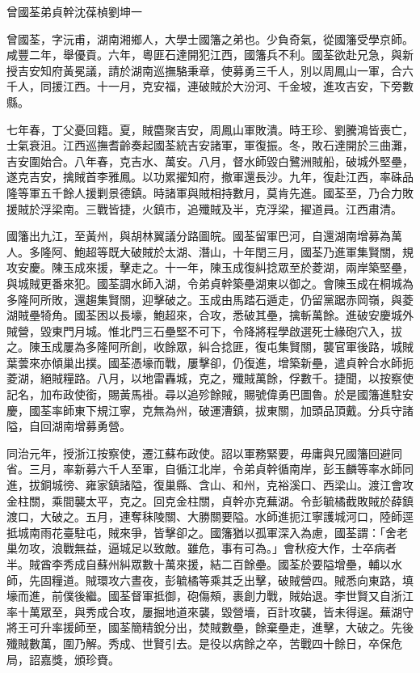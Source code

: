 
\begin{pinyinscope}
曾國荃弟貞幹沈葆楨劉坤一

曾國荃，字沅甫，湖南湘鄉人，大學士國籓之弟也。少負奇氣，從國籓受學京師。咸豐二年，舉優貢。六年，粵匪石達開犯江西，國籓兵不利。國荃欲赴兄急，與新授吉安知府黃冕議，請於湖南巡撫駱秉章，使募勇三千人，別以周鳳山一軍，合六千人，同援江西。十一月，克安福，連破賊於大汾河、千金坡，進攻吉安，下旁數縣。

七年春，丁父憂回籍。夏，賊麕聚吉安，周鳳山軍敗潰。時王珍、劉騰鴻皆喪亡，士氣衰沮。江西巡撫耆齡奏起國荃統吉安諸軍，軍復振。冬，敗石達開於三曲灘，吉安圍始合。八年春，克吉水、萬安。八月，督水師毀白鷺洲賊船，破城外堅壘，遂克吉安，擒賊首李雅鳳。以功累擢知府，撤軍還長沙。九年，復赴江西，率硃品隆等軍五千餘人援剿景德鎮。時諸軍與賊相持數月，莫肯先進。國荃至，乃合力敗援賊於浮梁南。三戰皆捷，火鎮市，追殲賊及半，克浮梁，擢道員。江西肅清。

國籓出九江，至黃州，與胡林翼議分路圖皖。國荃留軍巴河，自還湖南增募為萬人。多隆阿、鮑超等既大破賊於太湖、潛山，十年閏三月，國荃乃進軍集賢關，規攻安慶。陳玉成來援，擊走之。十一年，陳玉成復糾捻眾至於菱湖，兩岸築堅壘，與城賊更番來犯。國荃調水師入湖，令弟貞幹築壘湖東以御之。會陳玉成在桐城為多隆阿所敗，還趨集賢關，迎擊破之。玉成由馬踏石遁走，仍留黨踞赤岡嶺，與菱湖賊壘犄角。國荃困以長壕，鮑超來，合攻，悉破其壘，擒斬萬餘。進破安慶城外賊營，毀東門月城。惟北門三石壘堅不可下，令降將程學啟選死士緣砲穴入，拔之。陳玉成屢為多隆阿所創，收餘眾，糾合捻匪，復屯集賢關，襲官軍後路，城賊葉蕓來亦傾巢出撲。國荃憑壕而戰，屢擊卻，仍復進，增築新壘，遣貞幹合水師扼菱湖，絕賊糧路。八月，以地雷轟城，克之，殲賊萬餘，俘數千。捷聞，以按察使記名，加布政使銜，賜黃馬褂。尋以追殄餘賊，賜號偉勇巴圖魯。於是國籓進駐安慶，國荃率師東下規江寧，克無為州，破運漕鎮，拔東關，加頭品頂戴。分兵守諸隘，自回湖南增募勇營。

同治元年，授浙江按察使，遷江蘇布政使。詔以軍務緊要，毋庸與兄國籓回避同省。三月，率新募六千人至軍，自循江北岸，令弟貞幹循南岸，彭玉麟等率水師同進，拔銅城徬、雍家鎮諸隘，復巢縣、含山、和州，克裕溪口、西梁山。渡江會攻金柱關，乘間襲太平，克之。回克金柱關，貞幹亦克蕪湖。令彭毓橘截敗賊於薛鎮渡口，大破之。五月，連奪秣陵關、大勝關要隘。水師進扼江寧護城河口，陸師逕抵城南雨花臺駐屯，賊來爭，皆擊卻之。國籓猶以孤軍深入為慮，國荃謂：「舍老巢勿攻，浪戰無益，逼城足以致敵。雖危，事有可為。」會秋疫大作，士卒病者半。賊酋李秀成自蘇州糾眾數十萬來援，結二百餘壘。國荃於要隘增壘，輔以水師，先固糧道。賊環攻六晝夜，彭毓橘等乘其乏出擊，破賊營四。賊悉向東路，填壕而進，前僕後繼。國荃督軍抵御，砲傷頰，裹創力戰，賊始退。李世賢又自浙江率十萬眾至，與秀成合攻，屢掘地道來襲，毀營墻，百計攻襲，皆未得逞。蕪湖守將王可升率援師至，國荃簡精銳分出，焚賊數壘，餘棄壘走，進擊，大破之。先後殲賊數萬，圍乃解。秀成、世賢引去。是役以病餘之卒，苦戰四十餘日，卒保危局，詔嘉獎，頒珍賚。


\end{pinyinscope}
